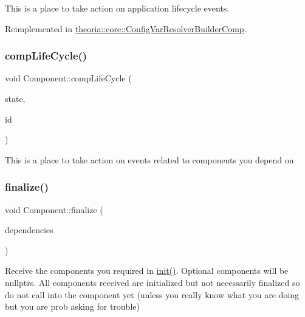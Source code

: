 This is a place to take action on application lifecycle events. 

Reimplemented in \hyperlink{classtheoria_1_1core_1_1ConfigVarResolverBuilderComp_ad7d3e9f8ab3a2837526ffc3eda4c6c38}{theoria\+::core\+::\+Config\+Var\+Resolver\+Builder\+Comp}.

\mbox{\label{classtheoria_1_1core_1_1Component_a92578e2b6253681a21b91e7c22b22975}} 
\subsubsection{\texorpdfstring{comp\+Life\+Cycle()}{compLifeCycle()}}
{\footnotesize\ttfamily void Component\+::comp\+Life\+Cycle (\begin{DoxyParamCaption}\item[{Comp\+Life\+Cycle}]{state,  }\item[{Comp\+Id}]{id }\end{DoxyParamCaption})\hspace{0.3cm}{\ttfamily [virtual]}}

This is a place to take action on events related to components you depend on \mbox{\label{classtheoria_1_1core_1_1Component_afd8acc89e2cd36e92bebe7e6fa530764}} 
\subsubsection{\texorpdfstring{finalize()}{finalize()}}
{\footnotesize\ttfamily void Component\+::finalize (\begin{DoxyParamCaption}\item[{const std\+::vector$<$ \hyperlink{classtheoria_1_1core_1_1Component}{Component} $\ast$$>$ \&}]{dependencies }\end{DoxyParamCaption})\hspace{0.3cm}{\ttfamily [virtual]}}

Receive the components you required in \hyperlink{classtheoria_1_1core_1_1Component_a7ed45f6e38442a40666ae4556f794f7d}{init()}. Optional components will be nullptrs. All components received are initialized but not necessarily finalized so do not call into the component yet (unless you really know what you are doing but you are prob asking for trouble) 


